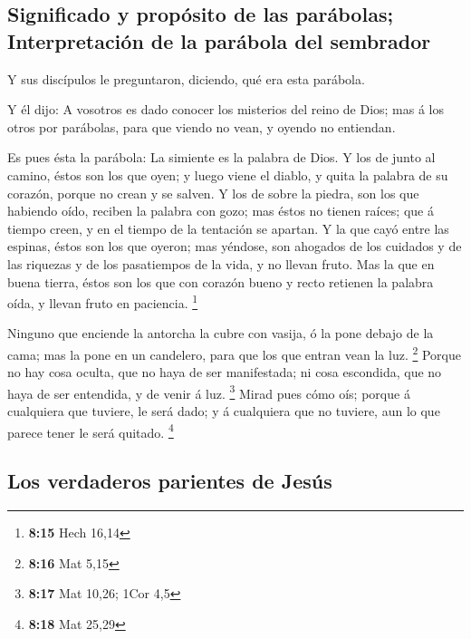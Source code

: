 \hypertarget{significado-y-propuxf3sito-de-las-paruxe1bolas-interpretaciuxf3n-de-la-paruxe1bola-del-sembrador}{%
\subsection{Significado y propósito de las parábolas; Interpretación de
la parábola del
sembrador}\label{significado-y-propuxf3sito-de-las-paruxe1bolas-interpretaciuxf3n-de-la-paruxe1bola-del-sembrador}}

 Y sus discípulos le preguntaron, diciendo, qué era esta
parábola.

 Y él dijo: A vosotros es dado conocer los misterios del
reino de Dios; mas á los otros por parábolas, para que viendo no vean, y
oyendo no entiendan.

 Es pues ésta la parábola: La simiente es la palabra de
Dios.  Y los de junto al camino, éstos son los que oyen; y
luego viene el diablo, y quita la palabra de su corazón, porque no crean
y se salven.  Y los de sobre la piedra, son los que
habiendo oído, reciben la palabra con gozo; mas éstos no tienen raíces;
que á tiempo creen, y en el tiempo de la tentación se apartan.
 Y la que cayó entre las espinas, éstos son los que oyeron;
mas yéndose, son ahogados de los cuidados y de las riquezas y de los
pasatiempos de la vida, y no llevan fruto.  Mas la que en
buena tierra, éstos son los que con corazón bueno y recto retienen la
palabra oída, y llevan fruto en paciencia. \footnote{\textbf{8:15} Hech
  16,14}

 Ninguno que enciende la antorcha la cubre con vasija, ó la
pone debajo de la cama; mas la pone en un candelero, para que los que
entran vean la luz. \footnote{\textbf{8:16} Mat 5,15} 
Porque no hay cosa oculta, que no haya de ser manifestada; ni cosa
escondida, que no haya de ser entendida, y de venir á luz. \footnote{\textbf{8:17}
  Mat 10,26; 1Cor 4,5}  Mirad pues cómo oís; porque á
cualquiera que tuviere, le será dado; y á cualquiera que no tuviere, aun
lo que parece tener le será quitado. \footnote{\textbf{8:18} Mat 25,29}

\hypertarget{los-verdaderos-parientes-de-jesuxfas}{%
\subsection{Los verdaderos parientes de
Jesús}\label{los-verdaderos-parientes-de-jesuxfas}}

